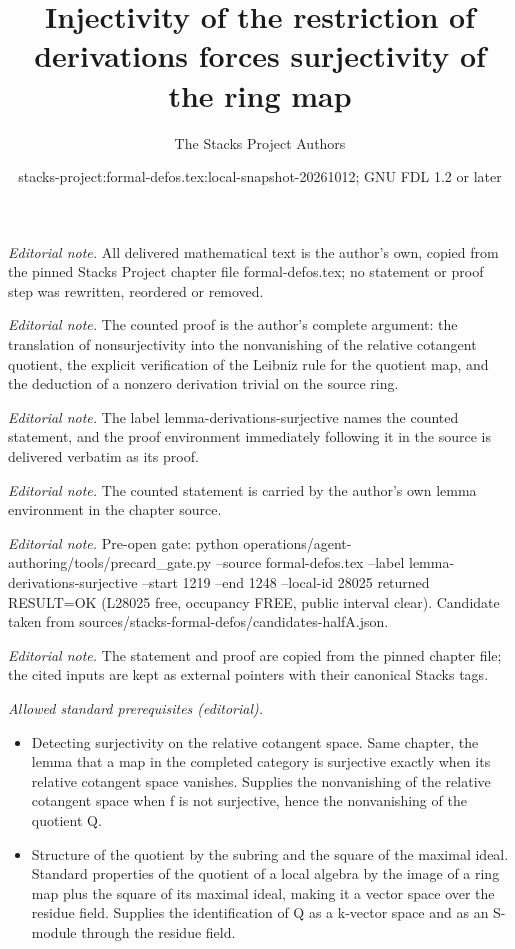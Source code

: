 \documentclass[10pt,a4paper]{amsart}
\title{Injectivity of the restriction of derivations forces surjectivity of the ring map}
\author{The Stacks Project Authors}
\date{stacks-project:formal-defos.tex:local-snapshot-20261012; GNU FDL 1.2 or later}
\theoremstyle{plain}
\theoremstyle{definition}
\theoremstyle{remark}
\numberwithin{equation}{subsection}
\begin{document}
\maketitle
\noindent\textit{Editorial note.} All delivered mathematical text is the author's own, copied from the pinned Stacks Project chapter file formal-defos.tex; no statement or proof step was rewritten, reordered or removed.\par\medskip
\noindent\textit{Editorial note.} The counted proof is the author's complete argument: the translation of nonsurjectivity into the nonvanishing of the relative cotangent quotient, the explicit verification of the Leibniz rule for the quotient map, and the deduction of a nonzero derivation trivial on the source ring.\par\medskip
\noindent\textit{Editorial note.} The label lemma-derivations-surjective names the counted statement, and the proof environment immediately following it in the source is delivered verbatim as its proof.\par\medskip
\noindent\textit{Editorial note.} The counted statement is carried by the author's own lemma environment in the chapter source.\par\medskip
\noindent\textit{Editorial note.} Pre-open gate: python operations/agent-authoring/tools/precard\_gate.py --source formal-defos.tex --label lemma-derivations-surjective --start 1219 --end 1248 --local-id 28025 returned RESULT=OK (L28025 free, occupancy FREE, public interval clear). Candidate taken from sources/stacks-formal-defos/candidates-halfA.json.\par\medskip
\noindent\textit{Editorial note.} The statement and proof are copied from the pinned chapter file; the cited inputs are kept as external pointers with their canonical Stacks tags.\par\medskip
\noindent\textit{Allowed standard prerequisites (editorial).}\begin{itemize}
\item Detecting surjectivity on the relative cotangent space. Same chapter, the lemma that a map in the completed category is surjective exactly when its relative cotangent space vanishes. Supplies the nonvanishing of the relative cotangent space when f is not surjective, hence the nonvanishing of the quotient Q.
\item Structure of the quotient by the subring and the square of the maximal ideal. Standard properties of the quotient of a local algebra by the image of a ring map plus the square of its maximal ideal, making it a vector space over the residue field. Supplies the identification of Q as a k-vector space and as an S-module through the residue field.
\end{itemize}\medskip
\end{document}
